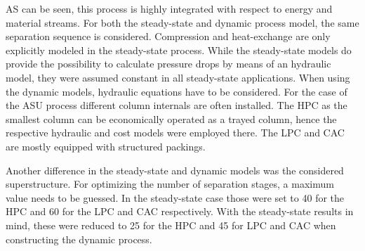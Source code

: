         AS can be seen, this process is highly integrated with respect to energy and material streams. For both the
        steady-state and dynamic process model, the same separation sequence is considered. Compression and heat-exchange
        are only explicitly modeled in the steady-state process. While the steady-state models do provide the possibility
        to calculate pressure drops by means of an hydraulic model, they were assumed constant in all steady-state applications.
        When using the dynamic models, hydraulic equations have to be considered. For the case of the ASU process different column
        internals are often installed. The HPC as the smallest column can be economically operated as a trayed column, hence the
        respective hydraulic and cost models were employed there. The LPC and CAC are mostly equipped with structured
        packings.

        Another difference in the steady-state and dynamic models was the considered superstructure. For optimizing the number
        of separation stages, a maximum value needs to be guessed. In the steady-state case those were set to 40 for the HPC
        and 60 for the LPC and CAC respectively. With the steady-state results in mind, these were reduced to 25 for the HPC
        and 45 for LPC and CAC when constructing the dynamic process.
